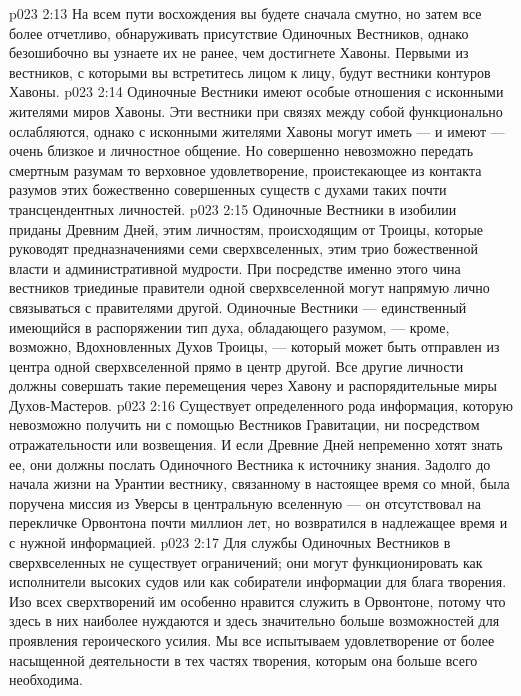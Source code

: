 \vs p023 2:13 \bibnobreakspace {} На всем пути восхождения вы будете сначала смутно, но затем все более отчетливо, обнаруживать присутствие Одиночных Вестников, однако безошибочно вы узнаете их не ранее, чем достигнете Хавоны. Первыми из вестников, с которыми вы встретитесь лицом к лицу, будут вестники контуров Хавоны.
\vs p023 2:14 Одиночные Вестники имеют особые отношения с исконными жителями миров Хавоны. Эти вестники при связях между собой функционально ослабляются, однако с исконными жителями Хавоны могут иметь --- и имеют --- очень близкое и личностное общение. Но совершенно невозможно передать смертным разумам то верховное удовлетворение, проистекающее из контакта разумов этих божественно совершенных существ с духами таких почти трансцендентных личностей.
\vs p023 2:15 \pc {}\bibnobreakspace {} Одиночные Вестники в изобилии приданы Древним Дней, этим личностям, происходящим от Троицы, которые руководят предназначениями семи сверхвселенных, этим трио божественной власти и административной мудрости. При посредстве именно этого чина вестников триединые правители одной сверхвселенной могут напрямую лично связываться с правителями другой. Одиночные Вестники --- единственный имеющийся в распоряжении тип духа, обладающего разумом, --- кроме, возможно, Вдохновленных Духов Троицы, --- который может быть отправлен из центра одной сверхвселенной прямо в центр другой. Все другие личности должны совершать такие перемещения через Хавону и распорядительные миры Духов\hyp{}Мастеров.
\vs p023 2:16 Существует определенного рода информация, которую невозможно получить ни с помощью Вестников Гравитации, ни посредством отражательности или возвещения. И если Древние Дней непременно хотят знать ее, они должны послать Одиночного Вестника к источнику знания. Задолго до начала жизни на Урантии вестнику, связанному в настоящее время со мной, была поручена миссия из Уверсы в центральную вселенную --- он отсутствовал на перекличке Орвонтона почти миллион лет, но возвратился в надлежащее время и с нужной информацией.
\vs p023 2:17 Для службы Одиночных Вестников в сверхвселенных не существует ограничений; они могут функционировать как исполнители высоких судов или как собиратели информации для блага творения. Изо всех сверхтворений им особенно нравится служить в Орвонтоне, потому что здесь в них наиболее нуждаются и здесь значительно больше возможностей для проявления героического усилия. Мы все испытываем удовлетворение от более насыщенной деятельности в тех частях творения, которым она больше всего необходима.
